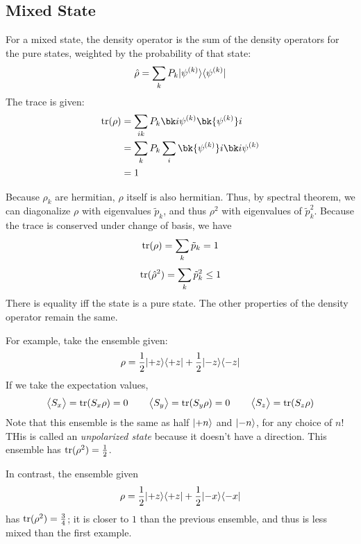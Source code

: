 \subsection{Mixed State}
For a mixed state, the density operator is the sum of the density operators for the pure states, weighted by the probability of that state:
\begin{equation}
	\hat \rho = \sum_k P_k\lvert\psi^{(k)}\rangle\langle\psi^{(k)}\rvert
\end{equation}
The trace is given:
\begin{align*}
	\tr(\rho)&=\sum_{ik}P_k\bk i{\p^{(k)}}\bk{\p^{(k)}}i\\
		 &=\sum_k P_k\sum_i\bk{\p^{(k)}} i \bk i {\p^{(k)}}\\
		 &=1
\end{align*}

Because \(\rho_k\) are hermitian, \(\rho\) itself is also hermitian. Thus, by spectral theorem, we can diagonalize \(\rho\) with eigenvalues \(\tilde p_k\), and thus \(\rho^2\) with eigenvalues of \(\tilde p_k^2\). Because the trace is conserved under change of basis, we have
\[\operatorname{tr}(\rho)=\sum_k \tilde p_k=1\]
\begin{equation}
	\operatorname{tr}(\hat\rho^2)=\sum_k\tilde{p}_k^2\leq 1
\end{equation}
There is equality iff the state is a pure state. The other properties of the density operator remain the same.

For example, take the ensemble given:
\[\rho = \frac{1}{2}\lvert+z\rangle\langle+z\rvert+\frac{1}{2}\lvert-z\rangle\langle-z\rvert\]
If we take the expectation values,
\[\left\langle \begin{matrix}S_x\end{matrix} \right\rangle = \operatorname{tr}(S_x\rho)=0 \qquad \left\langle \begin{matrix}S_y\end{matrix} \right\rangle=\operatorname{tr}(S_y\rho)=0 \qquad \left\langle \begin{matrix}S_z\end{matrix} \right\rangle=\operatorname{tr}(S_z\rho)\]
Note that this ensemble is the same as half \(\lvert+n\rangle\) and \(\lvert-n\rangle\), for any choice of \(n\)! THis is called an \emph{unpolarized state} because it doesn't have a direction. This ensemble has \(\operatorname{tr}(\rho^2)=\frac{1}{2}\). 

In contrast, the ensemble given
\[\rho = \frac{1}{2}\lvert+z\rangle\langle+z\rvert+\frac{1}{2}\lvert-x\rangle\langle-x\rvert\]
has \(\operatorname{tr}(\rho^2)=\frac{3}{4}\); it is closer to \(1\) than the previous ensemble, and thus is less mixed than the first example.

